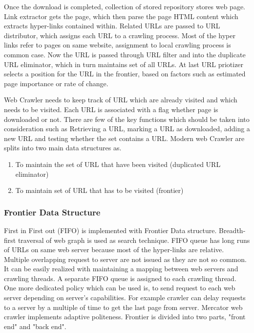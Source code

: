 \documentclass[article,type=msc,colorback,accentcolor=tud9c,twoside,11pt]{tudthesis}
\begin{document}
 Once the download is completed, collection of stored repository stores web page. Link extractor gets the page, which then parse the page HTML content which extracts hyper-links contained within. Related URLs are passed to URL distributor, which assigns each URL to a crawling process. Most of the hyper links refer to pages on same website, assignment to local crawling process is common case. Now the URL is passed through URL filter and into the duplicate URL eliminator, which in turn maintains set of all URLs.  At last URL priotizer selects a position for the URL in the frontier, based on factors such as estimated page importance or rate of change.
 
Web Crawler needs to keep track of URL which are already visited and which needs to be visited. Each URL is associated with a flag whether page is downloaded or not. There are few of the key functions which should be taken into consideration such as Retrieving a URL, marking a URL as downloaded, adding a new URL and testing whether the set contains a URL. Modern web Crawler are splits into two main data structures as. 
 \begin{enumerate}
\item To maintain the set of URL that have been visited (duplicated URL eliminator)
\item To maintain set of URL that has to be visited (frontier)
\end{enumerate}

\subsubsection{Frontier Data Structure}
First in First out (FIFO) is implemented with  Frontier Data structure. Breadth-first traversal of web graph is used as search technique. FIFO queue has long runs of URLs on same web server because most of the  hyper-links are relative. Multiple overlapping request to server are not issued as they are not so common. It can be easily realized with maintaining a mapping between web servers and crawling threads. A separate FIFO queue is assigned to each crawling thread. One more dedicated policy which can be used is, to send request to each web server depending on server's capabilities. For example crawler can delay requests to a server by a multiple of time to get the last page from server. Mercator web crawler implements adaptive politeness. Frontier is divided into two parts, "front end" and "back end".
\end{document}
